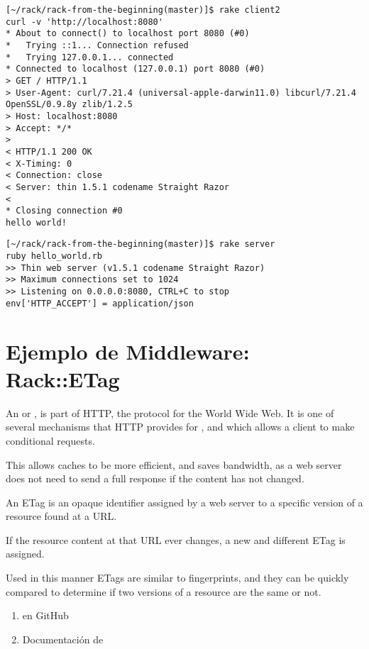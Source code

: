 \begin{verbatim}
[~/rack/rack-from-the-beginning(master)]$ rake client2
curl -v 'http://localhost:8080'
* About to connect() to localhost port 8080 (#0)
*   Trying ::1... Connection refused
*   Trying 127.0.0.1... connected
* Connected to localhost (127.0.0.1) port 8080 (#0)
> GET / HTTP/1.1
> User-Agent: curl/7.21.4 (universal-apple-darwin11.0) libcurl/7.21.4 OpenSSL/0.9.8y zlib/1.2.5
> Host: localhost:8080
> Accept: */*
> 
< HTTP/1.1 200 OK
< X-Timing: 0
< Connection: close
< Server: thin 1.5.1 codename Straight Razor
< 
* Closing connection #0
hello world!
\end{verbatim}

\begin{verbatim}
[~/rack/rack-from-the-beginning(master)]$ rake server
ruby hello_world.rb
>> Thin web server (v1.5.1 codename Straight Razor)
>> Maximum connections set to 1024
>> Listening on 0.0.0.0:8080, CTRL+C to stop
env['HTTP_ACCEPT'] = application/json
\end{verbatim}

\section{Ejemplo de Middleware: Rack::ETag}

An  or , is part of HTTP, the protocol for the World
Wide Web. It is one of several mechanisms that HTTP provides for
, and which allows a client to make conditional
requests. 

This allows caches to be more efficient, and saves
bandwidth, as a web server does not need to send a full response
if the content has not changed.

An ETag is an opaque identifier assigned by a web server to a
specific version of a resource found at a URL. 

If the resource
content at that URL ever changes, a new and different ETag is
assigned. 

Used in this manner ETags are similar to fingerprints,
and they can be quickly compared to determine if two versions of a
resource are the same or not.

\begin{enumerate}
\item 
{}
en GitHub
\item 
Documentación de  
\end{enumerate}

